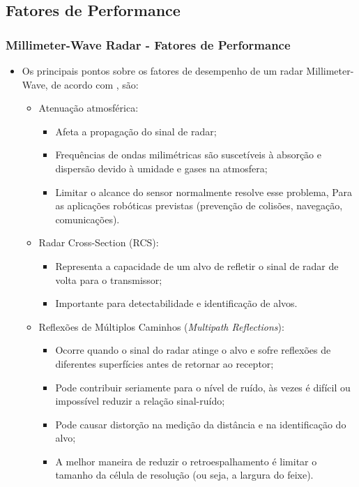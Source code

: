 \documentclass[xcolor=dvipsnames, aspectratio=169]{beamer}
\begin{document}
    \subsection[Introdução]{Fatores de Performance} 
    \begin{frame}
    \frametitle{Millimeter-Wave Radar - Fatores de Performance}
        \begin{itemize}
            \item Os principais pontos sobre os fatores de desempenho de um radar Millimeter-Wave, de acordo com \cite{everett1995sensors}, são:
            \begin{itemize}
                \item Atenuação atmosférica:
                \begin{itemize}
                    \item Afeta a propagação do sinal de radar;
                    \item Frequências de ondas milimétricas são suscetíveis à absorção e dispersão devido à umidade e gases na atmosfera;
                    \item Limitar o alcance do sensor normalmente resolve esse problema, Para as aplicações robóticas previstas (prevenção de colisões, navegação,
                    comunicações).
                \end{itemize}
                \item Radar Cross-Section (RCS):
                \begin{itemize}
                    \item Representa a capacidade de um alvo de refletir o sinal de radar de volta para o transmissor;
                    \item Importante para detectabilidade e identificação de alvos.
                \end{itemize}
                \item Reflexões de Múltiplos Caminhos (\textit{Multipath Reflections}):
                \begin{itemize}
                    \item Ocorre quando o sinal do radar atinge o alvo e sofre reflexões de diferentes superfícies antes de retornar ao receptor;
                    \item Pode contribuir seriamente para o nível de ruído, às vezes é difícil ou impossível reduzir a relação sinal-ruído;
                    \item Pode causar distorção na medição da distância e na identificação do alvo;
                    \item A melhor maneira de reduzir o retroespalhamento é limitar o tamanho da célula
                    de resolução (ou seja, a largura do feixe).
                \end{itemize}


\end{itemize}
\end{itemize}
\end{frame}
\end{document}
